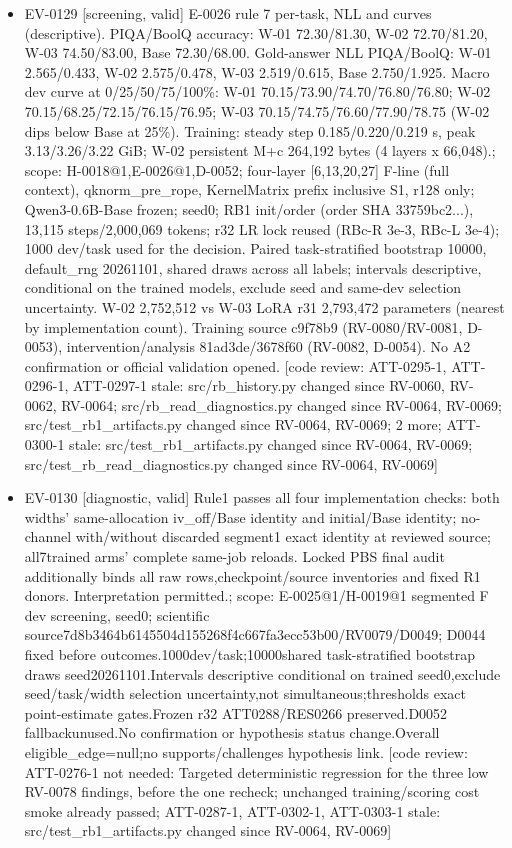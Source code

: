 \documentclass[11pt]{article}
\begin{document}
\begin{itemize}
\item EV-0129 [screening, valid] E-0026 rule 7 per-task, NLL and curves (descriptive). PIQA/BoolQ accuracy: W-01 72.30/81.30, W-02 72.70/81.20, W-03 74.50/83.00, Base 72.30/68.00. Gold-answer NLL PIQA/BoolQ: W-01 2.565/0.433, W-02 2.575/0.478, W-03 2.519/0.615, Base 2.750/1.925. Macro dev curve at 0/25/50/75/100\%: W-01 70.15/73.90/74.70/76.80/76.80; W-02 70.15/68.25/72.15/76.15/76.95; W-03 70.15/74.75/76.60/77.90/78.75 (W-02 dips below Base at 25\%). Training: steady step 0.185/0.220/0.219 s, peak 3.13/3.26/3.22 GiB; W-02 persistent M+c 264,192 bytes (4 layers x 66,048).; scope: H-0018@1,E-0026@1,D-0052; four-layer [6,13,20,27] F-line (full context), qknorm\_pre\_rope, KernelMatrix prefix inclusive S1, r128 only; Qwen3-0.6B-Base frozen; seed0; RB1 init/order (order SHA 33759bc2...), 13,115 steps/2,000,069 tokens; r32 LR lock reused (RBc-R 3e-3, RBc-L 3e-4); 1000 dev/task used for the decision. Paired task-stratified bootstrap 10000, default\_rng 20261101, shared draws across all labels; intervals descriptive, conditional on the trained models, exclude seed and same-dev selection uncertainty. W-02 2,752,512 vs W-03 LoRA r31 2,793,472 parameters (nearest by implementation count). Training source c9f78b9 (RV-0080/RV-0081, D-0053), intervention/analysis 81ad3de/3678f60 (RV-0082, D-0054). No A2 confirmation or official validation opened. [code review: ATT-0295-1, ATT-0296-1, ATT-0297-1 stale: src/rb\_history.py changed since RV-0060, RV-0062, RV-0064; src/rb\_read\_diagnostics.py changed since RV-0064, RV-0069; src/test\_rb1\_artifacts.py changed since RV-0064, RV-0069; 2 more; ATT-0300-1 stale: src/test\_rb1\_artifacts.py changed since RV-0064, RV-0069; src/test\_rb\_read\_diagnostics.py changed since RV-0064, RV-0069]
\item EV-0130 [diagnostic, valid] Rule1 passes all four implementation checks: both widths' same-allocation iv\_off/Base identity and initial/Base identity; no-channel with/without discarded segment1 exact identity at reviewed source; all7trained arms' complete same-job reloads. Locked PBS final audit additionally binds all raw rows,checkpoint/source inventories and fixed R1 donors. Interpretation permitted.; scope: E-0025@1/H-0019@1 segmented F dev screening, seed0; scientific source7d8b3464b6145504d155268f4c667fa3ecc53b00/RV0079/D0049; D0044 fixed before outcomes.1000dev/task;10000shared task-stratified bootstrap draws seed20261101.Intervals descriptive conditional on trained seed0,exclude seed/task/width selection uncertainty,not simultaneous;thresholds exact point-estimate gates.Frozen r32 ATT0288/RES0266 preserved.D0052 fallbackunused.No confirmation or hypothesis status change.Overall eligible\_edge=null;no supports/challenges hypothesis link. [code review: ATT-0276-1 not needed: Targeted deterministic regression for the three low RV-0078 findings, before the one recheck; unchanged training/scoring cost smoke already passed; ATT-0287-1, ATT-0302-1, ATT-0303-1 stale: src/test\_rb1\_artifacts.py changed since RV-0064, RV-0069]

\end{itemize}
\end{document}
